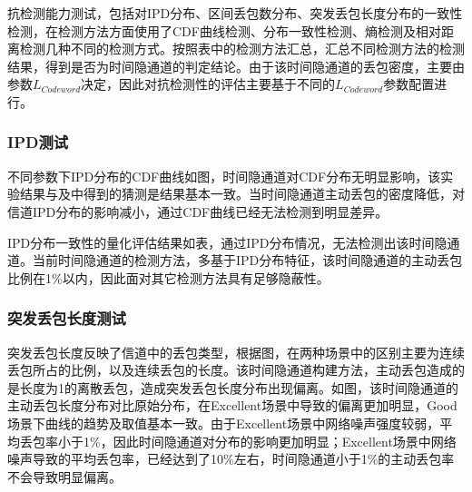 抗检测能力测试，包括对IPD分布、区间丢包数分布、突发丢包长度分布的一致性检测，在检测方法方面使用了CDF曲线检测、分布一致性检测、熵检测及相对距离检测几种不同的检测方式。按照表中的检测方法汇总，汇总不同检测方法的检测结果，得到是否为时间隐通道的判定结论。由于该时间隐通道的丢包密度，主要由参数$L_{Codeword}$决定，因此对抗检测性的评估主要基于不同的$L_{Codeword}$参数配置进行。

\subsubsection{IPD测试}
\label{chap:hash:result:undetectability:ipd}

不同参数下IPD分布的CDF曲线如图，时间隐通道对CDF分布无明显影响，该实验结果与及中得到的猜测是结果基本一致。当时间隐通道主动丢包的密度降低，对信道IPD分布的影响减小，通过CDF曲线已经无法检测到明显差异。


IPD分布一致性的量化评估结果如表，通过IPD分布情况，无法检测出该时间隐通道。当前时间隐通道的检测方法，多基于IPD分布特征，该时间隐通道的主动丢包比例在1\%以内，因此面对其它检测方法具有足够隐蔽性。

\subsubsection{突发丢包长度测试}
\label{chap:hash:result:undetectability:burst}

突发丢包长度反映了信道中的丢包类型，根据图，在两种场景中的区别主要为连续丢包所占的比例，以及连续丢包的长度。该时间隐通道构建方法，主动丢包造成的是长度为1的离散丢包，造成突发丢包长度分布出现偏离。如图，该时间隐通道的主动丢包长度分布对比原始分布，在Excellent场景中导致的偏离更加明显，Good场景下曲线的趋势及取值基本一致。由于Excellent场景中网络噪声强度较弱，平均丢包率小于1\%，因此时间隐通道对分布的影响更加明显；Excellent场景中网络噪声导致的平均丢包率，已经达到了10\%左右，时间隐通道小于1\%的主动丢包率不会导致明显偏离。

